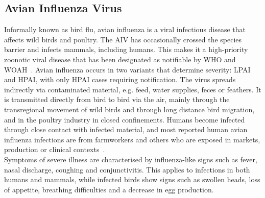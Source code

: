 \subsection{Avian Influenza Virus}
Informally known as bird flu, avian influenza is a viral infectious disease that affects wild birds and poultry. The \ac{AIV} has occasionally crossed the species barrier and infects mammals, including humans. This makes it a high-priority zoonotic viral disease that has been designated as notifiable by \ac{WHO} and \ac{WOAH}~\cite{woah2023list}. Avian influenza occurs in two variants that determine severity: \ac{LPAI} and \ac{HPAI}, with only \ac{HPAI} cases requiring notification. The virus spreads indirectly via contaminated material, e.g. feed, water supplies, feces or feathers. It is transmitted directly from bird to bird via the air, mainly through the transregional movement of wild birds and through long distance bird migration, and in the poultry industry in closed confinements. Humans become infected through close contact with infected material, and most reported human avian influenza infections are from farmworkers and others who are exposed in markets, production or clinical contexts~\cite{webster1992evolution}. \\
Symptoms of severe illness are characterised by influenza-like signs such as fever, nasal discharge, coughing and conjunctivitis. This applies to infections in both humans and mammals, while infected birds show signs such as swollen heads, loss of appetite, breathing difficulties and a decrease in egg production.

